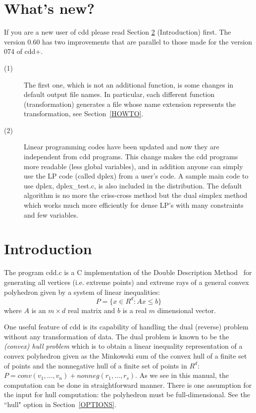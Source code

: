 \section{What's new?}
If you are a new user of cdd please read Section \ref{INTRODUCTION} (Introduction) first.
The version 0.60 has two improvements that are parallel to
those made for the version 074 of cdd+.  
\begin{description}
\item[(1)] The first one, which is not an additional
function, is some changes in default output file names.  In particular, each different
function (transformation) generates a file whose name extension
 represents the transformation, see Section~\ref{HOWTO}.
\item[(2)] Linear programming codes have been updated and now
they are independent from cdd programs.  This change makes
the cdd programs more readable (less global variables), and
in addition anyone can simply use the LP code (called dplex) from
a user's code.  A sample main code to use dplex, dplex\_test.c,
is also included in the distribution.
The default algorithm is no more the criss-cross method but
 the dual simplex method which works much more efficiently for dense LP's 
with many constraints and few variables.
\end{description}

\section{Introduction} \label{INTRODUCTION}

The program  cdd.c  is a C implementation of 
the Double Description Method~\cite{MRTT}
for generating all vertices (i.e. extreme points)
and extreme rays of a general 
convex polyhedron given by a system of linear inequalities:
\[
   P = \{ x  \in R^d:  A  x  \le  b \}
\]
where $A$ is an $m \times d$ real matrix and $b$ is a real
$m$ dimensional vector.

One useful feature of cdd is its capability
of handling the dual (reverse)  problem without any transformation
of data.  The dual problem is known to be the 
{\em (convex) hull problem\/} which
is to obtain a linear inequality representation
of a convex polyhedron given as the Minkowski sum of 
the convex hull of a finite set of points and the nonnegative
hull of a finite set of points in $R^d$: 
$P = conv(v_1,\ldots,v_n) +  nonneg(r_1,\ldots,r_s)$.
As we see in this manual, the computation can be done
in straightforward manner.  There is one assumption for the input
for hull computation: the polyhedron must be full-dimensional.
See the ``hull" option in Section~\ref{OPTIONS}.

